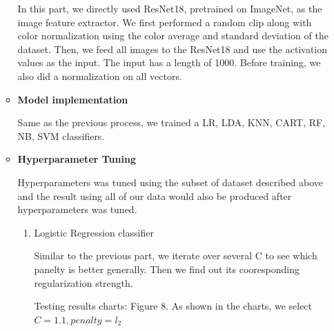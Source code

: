 \documentclass[11.5pt]{article}
\begin{document}
\begin{enumerate}
\begin{itemize}
            In this part, we directly used ResNet18, pretrained on ImageNet, as the image feature extractor. We first performed a random clip along with color normalization using the color average and standard deviation of the dataset. Then, we feed all images to the ResNet18 and use the activation values as the input. The input has a length of 1000. Before training, we also did a normalization on all vectors.
            \item \textbf{Model implementation}

            Same as the previous process, we trained a LR, LDA, KNN, CART, RF, NB, SVM classifiers.
            \item \textbf{Hyperparameter Tuning}

            Hyperparameters was tuned using the subset of dataset described above and the result using all of our data would also be produced after hyperparameters was tuned.
            \begin{enumerate}
                \item Logistic Regression classifier

                Similar to the previous part, we iterate over several C to see which panelty is better generally. Then we find out its cooresponding regularization strength.

                Testing results charts: Figure 8. As shown in the charts, we select $C = 1.1, penalty = l_2$


\end{enumerate}
\end{itemize}
\end{enumerate}
\end{document}
